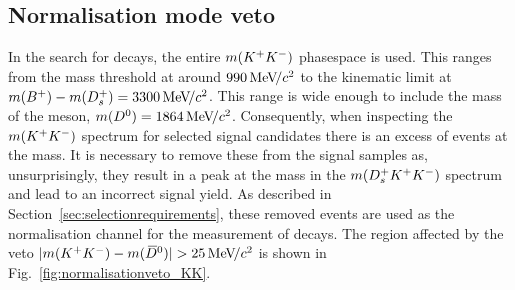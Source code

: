 \subsection{Normalisation mode veto}
\label{sec:normvetos}

In the search for \decay{\Bp}{\Dsp\Kp\Km} decays, the entire $m({{K}^+}{{K}^-})$ phasespace is used. This ranges from the \Kp\Km mass threshold at around $990{\mathrm{\,Me\kern -0.1em V\!/}c^2}$ to the kinematic limit at $m({{{B}^+}}) - m({{D}^+_{s}}) = 3300{\mathrm{\,Me\kern -0.1em V\!/}c^2}$. This range is wide enough to include the mass of the \Dzb meson, $m({{D}^0}) = 1864 {\mathrm{\,Me\kern -0.1em V\!/}c^2}$. Consequently, when inspecting the $m({{K}^+}{{K}^-})$ spectrum for selected signal candidates there is an excess of events at the \Dz mass. It is necessary to remove these from the signal samples as, unsurprisingly, they result in a peak at the \Bp mass in the $m({{D}^+_{s}}{{K}^+}{{K}^-})$ spectrum and lead to an incorrect signal yield. As described in Section~\ref{sec:selectionrequirements}, these removed events are used as the normalisation channel for the measurement of \decay{\Bp}{\Dsp\Kp\Km} decays. 
The region affected by the veto $|m({{K}^+}{{K}^-}) - m({{\kern 0.2em\overline{\kern -0.2em D}{}}{}^0})| > 25 {\mathrm{\,Me\kern -0.1em V\!/}c^2}$ is shown in Fig.~\ref{fig:normalisationveto_KK}.

